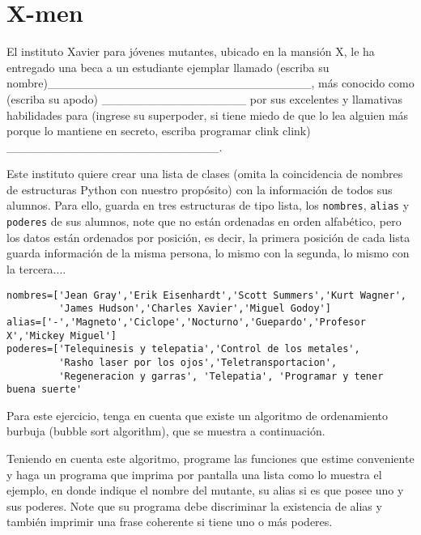 \section{X-men}

El instituto Xavier para jóvenes mutantes, ubicado en la mansión X, le ha entregado una beca a un estudiante ejemplar llamado (escriba su nombre)\_\_\_\_\_\_\_\_\_\_\_\_\_\_\_\_\_\_\_\_\_\_\_\_\_\_\_\_\_\_\_, más conocido como (escriba su apodo) \_\_\_\_\_\_\_\_\_\_\_\_\_\_\_\_\_ por sus excelentes y llamativas habilidades para (ingrese su superpoder, si tiene miedo de que lo lea alguien más porque lo mantiene en secreto, escriba programar clink clink) \_\_\_\_\_\_\_\_\_\_\_\_\_\_\_\_\_\_\_\_\_\_\_\_\_.

Este instituto quiere crear una lista de clases (omita la coincidencia de nombres de estructuras Python con nuestro propósito) con la información de todos sus alumnos. Para ello, guarda en tres estructuras de tipo lista, los \texttt{nombres}, \texttt{alias} y \texttt{poderes} de sus alumnos, note que no están ordenadas en orden alfabético, pero los datos están ordenados por posición, es decir, la primera posición de cada lista guarda información de la misma persona, lo mismo con la segunda, lo mismo con la tercera....

\begin{lstlisting}[style=consola]
nombres=['Jean Gray','Erik Eisenhardt','Scott Summers','Kurt Wagner',
         'James Hudson','Charles Xavier','Miguel Godoy']
alias=['-','Magneto','Ciclope','Nocturno','Guepardo','Profesor X','Mickey Miguel']
poderes=['Telequinesis y telepatia','Control de los metales',
         'Rasho laser por los ojos','Teletransportacion',
         'Regeneracion y garras', 'Telepatia', 'Programar y tener buena suerte'
\end{lstlisting}

Para este ejercicio, tenga en cuenta que existe un algoritmo de ordenamiento burbuja (bubble sort algorithm), que se muestra a continuación.



Teniendo en cuenta este algoritmo, programe las funciones que estime conveniente y haga un programa que imprima por pantalla una lista como lo muestra el ejemplo, en donde indique el nombre del mutante, su alias si es que posee uno y sus poderes. Note que su programa debe discriminar la existencia de alias y también imprimir una frase coherente si tiene uno o más poderes.

